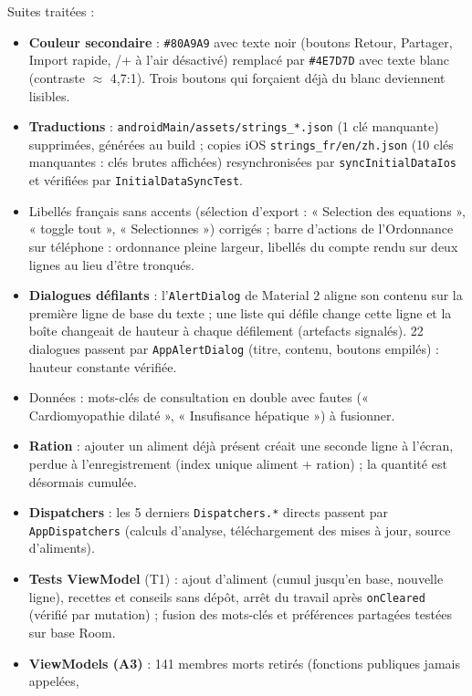 \documentclass[11pt,a4paper]{article}
\newcommand{\code}[1]{\texttt{#1}}
\begin{document}
Suites traitées :
\begin{itemize}
  \item \textbf{Couleur secondaire} : \code{\#80A9A9} avec texte noir (boutons Retour, Partager,
        Import rapide, \textminus/+ à l'air désactivé) remplacé par \code{\#4E7D7D} avec texte
        blanc (contraste $\approx$ 4,7:1). Trois boutons qui forçaient déjà du blanc deviennent lisibles.
  \item \textbf{Traductions} : \code{androidMain/assets/strings\_*.json} (1 clé manquante) supprimées,
        générées au build ; copies iOS \code{strings\_fr/en/zh.json} (10 clés manquantes : clés brutes
        affichées) resynchronisées par \code{syncInitialDataIos} et vérifiées par
        \code{InitialDataSyncTest}.
  \item Libellés français sans accents (sélection d'export : « Selection des equations »,
        « toggle tout », « Selectionnes ») corrigés ; barre d'actions de l'Ordonnance sur téléphone :
        ordonnance pleine largeur, libellés du compte rendu sur deux lignes au lieu d'être tronqués.
  \item \textbf{Dialogues défilants} : l'\code{AlertDialog} de Material 2 aligne son contenu sur la
        première ligne de base du texte ; une liste qui défile change cette ligne et la boîte
        changeait de hauteur à chaque défilement (artefacts signalés). 22 dialogues passent par
        \code{AppAlertDialog} (titre, contenu, boutons empilés) : hauteur constante vérifiée.
  \item Données : mots-clés de consultation en double avec fautes (« Cardiomyopathie dilaté »,
        « Insufisance hépatique ») à fusionner.
  \item \textbf{Ration} : ajouter un aliment déjà présent créait une seconde ligne à l'écran, perdue à
        l'enregistrement (index unique aliment + ration) ; la quantité est désormais cumulée.
  \item \textbf{Dispatchers} : les 5 derniers \code{Dispatchers.*} directs passent par
        \code{AppDispatchers} (calculs d'analyse, téléchargement des mises à jour, source d'aliments).
  \item \textbf{Tests ViewModel} (T1) : ajout d'aliment (cumul jusqu'en base, nouvelle ligne),
        recettes et conseils sans dépôt, arrêt du travail après \code{onCleared} (vérifié par mutation) ;
        fusion des mots-clés et préférences partagées testées sur base Room.
  \item \textbf{ViewModels (A3)} : 141 membres morts retirés (fonctions publiques jamais appelées,

\end{itemize}
\end{document}
